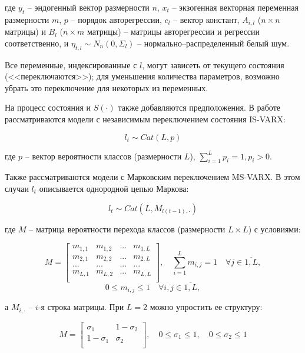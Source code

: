 \documentclass[a4paper,14pt]{extreport}
\begin{document}
где 
$y_t$ -- эндогенный вектор размерности $n$, 
$x_{t}$ -- экзогенная векторная переменная размерности $m$,
$p$ -- порядок авторегрессии, 
$c_{l}$ -- вектор констант,
$A_{i,l}$ ($n \times n$ матрицы) и $B_{l}$ ($n \times m$ матрицы) -- матрицы авторегрессии и регрессии соответственно,
и $\eta_{t, l} \sim N_n(0, \Sigma_{l}) $ -- нормально–распределенный белый шум.

Все переменные, индексированные с $l$, могут зависеть от текущего состояния (<<переключаются>>); для уменьшения количества параметров, возможно убрать это переключение для некоторых из переменных.

На процесс состояния и $S(\cdot)$ также добавляются предположения. В работе рассматриваются модели с независимым переключением состояния IS-VARX:

\[ 
	l_t \sim \mathit{Cat}(L, p)
\]

где $p$ -- вектор вероятности классов (размерности $L$), $\sum_{i=1}^{L}{p_i} = 1, p_i > 0$.

Также рассматриваются модели с Марковским переключением MS-VARX. 
В этом случаи $l_t$ описывается однородной цепью Маркова:

\[
	l_t \sim \mathit{Cat}(L, M_{l(t-1), \cdot})
\]

где $M$ -- матрица вероятности перехода классов (размерности $L \times L$) с условиями:

\[
	M=
	\left[
		{
				\begin{array}{cccc}
					m_{1,1} & m_{1,2} & ... & m_{1,L} \\
					m_{2,1} & m_{2,2} & ... & m_{2,L} \\
					...     & ...     & ... & ...     \\
					m_{L,1} & m_{L,2} & ... & m_{L,L} \\
				\end{array}
			}
		\right]
	, \quad
	\sum_{i=1}^{L} m_{i,j} = 1 \quad \forall j \in \overline{1,L}
	,
\]
\[
	0 \le m_{i,j} \le 1 \quad \forall i, j \in \overline{1,L},
\]

а $M_{i, \cdot}$ -- $i$-я строка матрицы. При $L=2$ можно упростить ее структуру:

\[
	M=
	\left[ {\begin{array}{cc}
					\sigma_{1}   & 1-\sigma_{2} \\
					1-\sigma_{1} & \sigma_{2}   \\
				\end{array} } \right]
	, \quad 
	0 \le \sigma_{1} \le 1
	, \quad 
	0 \le \sigma_{2} \le 1
\]
\end{document}

